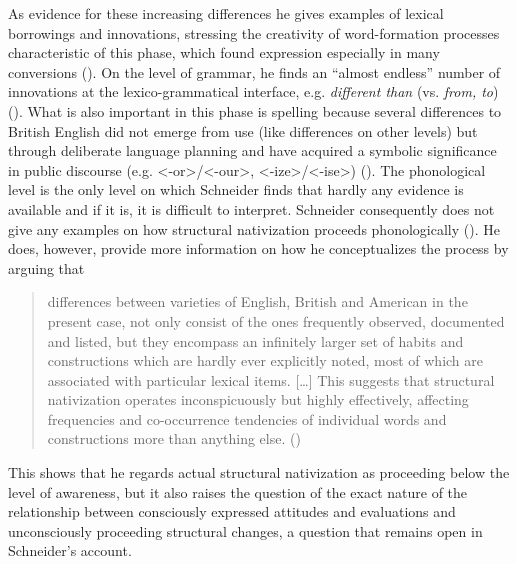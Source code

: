 As evidence for these increasing differences he gives examples of lexical borrowings and innovations, stressing the creativity of word-formation processes characteristic of this phase, which found expression especially in many conversions (\citeyear[279]{Schneider2007}). On the level of grammar, he finds an “almost endless” number of innovations at the lexico-grammatical interface, e.g. \emph{different than} (vs. \emph{from, to}) (\citeyear[280]{Schneider2007}). What is also important in this phase is spelling because several differences to British English did not emerge from use (like differences on other levels) but through deliberate language planning and have acquired a symbolic significance in public discourse (e.g. <-or>/<-our>, <-ize>/<-ise>) (\citeyear[281]{Schneider2007}). The phonological level is the only level on which Schneider finds that hardly any evidence is available and if it is, it is difficult to interpret. Schneider consequently does not give any examples on how structural nativization proceeds phonologically (\citeyear[279]{Schneider2007}). He does, however, provide more information on how he conceptualizes the process by arguing that


\begin{quote}
differences between varieties of English, British and American in the present case, not only consist of the ones frequently observed, documented and listed, but they encompass an infinitely larger set of habits and constructions which are hardly ever explicitly noted, most of which are associated with particular lexical items. […] This suggests that structural nativization operates inconspicuously but highly effectively, affecting frequencies and co-occurrence tendencies of individual words and constructions more than anything else. (\citeyear[282]{Schneider2007})
\end{quote}


This shows that he regards actual structural nativization as proceeding below the level of awareness, but it also raises the question of the exact nature of the relationship between consciously expressed attitudes and evaluations and unconsciously proceeding structural changes, a question that remains open in Schneider’s account.


